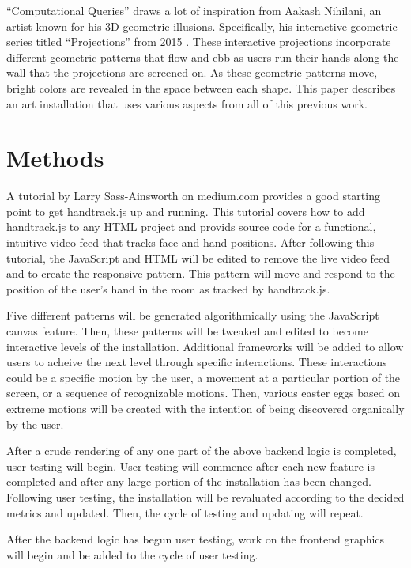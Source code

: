 \documentclass[10pt,twocolumn]{article}
\begin{document}
``Computational Queries'' draws a lot of inspiration from Aakash Nihilani, an artist known for his 3D geometric illusions. Specifically, his interactive geometric series titled ``Projections'' from 2015 \cite{oauthor_aakash_nodate}.  These interactive projections incorporate different geometric patterns that flow and ebb as users run their hands along the wall that the projections are screened on. As these geometric patterns move, bright colors are revealed in the space between each shape.  This paper describes an art installation that uses various aspects from all of this previous work. 

\section{Methods}
 A tutorial by Larry Sass-Ainsworth on medium.com \cite{sass-ainsworth_getting_2019} provides a good starting point to get handtrack.js up and running.  This tutorial covers how to add handtrack.js to any HTML project and provids source code for a functional, intuitive video feed that tracks face and hand positions. After following this tutorial, the JavaScript and HTML will be edited to remove the live video feed and to create the responsive pattern.  This pattern will move and respond to the position of the user's hand in the room as tracked by handtrack.js. 
 
Five different patterns will be generated algorithmically using the JavaScript canvas feature. Then, these patterns will be tweaked and edited to become interactive levels of the installation.  Additional frameworks will be added to allow users to acheive the next level through specific interactions.  These interactions could be a specific motion by the user, a movement at a particular portion of the screen, or a sequence of recognizable motions.  Then, various easter eggs based on extreme motions will be created with the intention of being discovered organically by the user. 

After a crude rendering of any one part of the above backend logic is completed, user testing will begin. User testing will commence after each new feature is completed and after any large portion of the installation has been changed. Following user testing, the installation will be revaluated according to the decided metrics and updated. Then, the cycle of testing and updating will repeat. 

After the backend logic has begun user testing, work on the frontend graphics will begin and be added to the cycle of user testing. 
\end{document}
